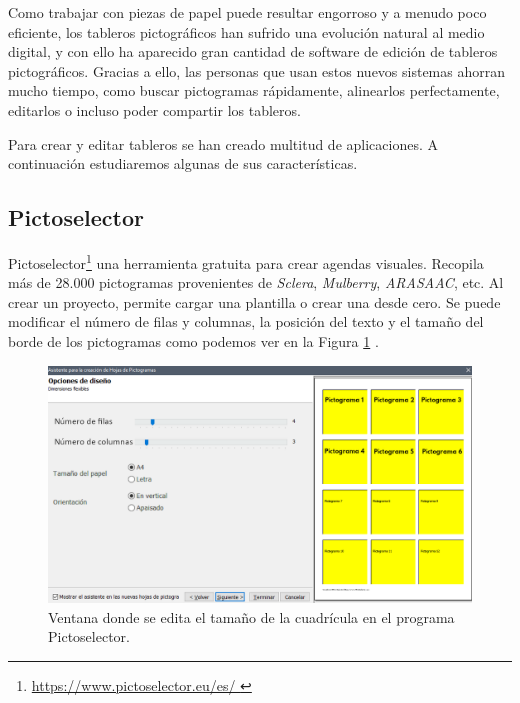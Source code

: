 Como trabajar con piezas de papel puede resultar engorroso y a menudo poco eficiente, los tableros pictográficos han sufrido una evolución natural al medio digital, y con ello ha aparecido gran cantidad de software de edición de tableros pictográficos. Gracias a ello, las personas que usan estos nuevos sistemas ahorran mucho tiempo, como buscar pictogramas rápidamente, alinearlos perfectamente, editarlos o incluso poder compartir los tableros.


Para crear y editar tableros se han creado multitud de aplicaciones. A continuación estudiaremos algunas de sus características.



\subsection{Pictoselector}
\label{cap2:sec:pictoselector}
Pictoselector\footnote{\url{ https://www.pictoselector.eu/es/ }} una herramienta gratuita para crear agendas visuales.  Recopila más de 28.000 pictogramas provenientes de \textit{Sclera}, \textit{Mulberry}, \textit{ARASAAC}, etc. Al crear un proyecto, permite cargar una plantilla o crear una desde cero. Se puede modificar el número de filas y columnas, la posición del texto y el tamaño del borde de los pictogramas como podemos ver en la Figura \ref{fig:pictoselector-tablero} .


\begin{figure}[h!]
	\centering
	\includegraphics[width=0.7\linewidth]{Imagenes/Bitmap/Pictoselector Tablero}
	\caption{Ventana donde se edita el tamaño de la cuadrícula en el programa Pictoselector.}
	\label{fig:pictoselector-tablero}
\end{figure}


